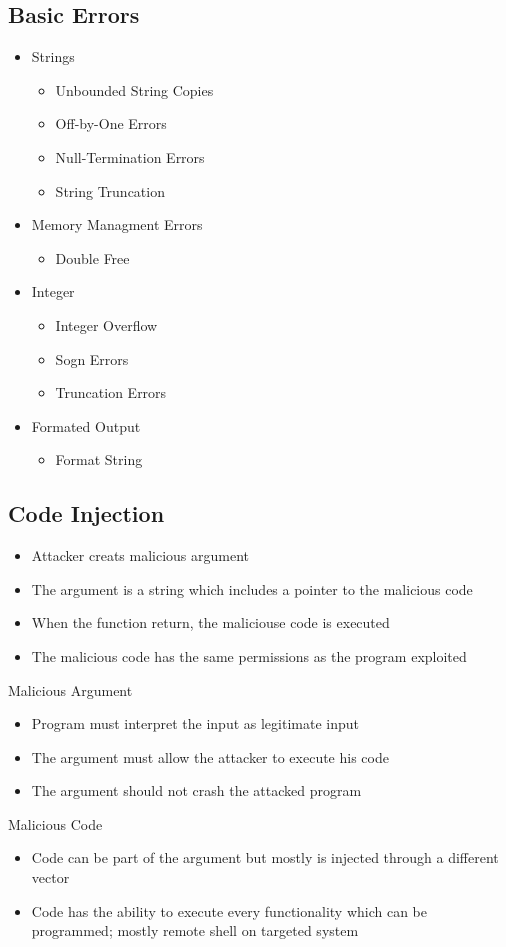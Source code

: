\documentclass[a4paper, 12pt]{article}
\begin{document}
\subsection{Basic Errors}
\begin{itemize}
\item Strings
\begin{itemize}
\item Unbounded String Copies
\item Off-by-One Errors
\item Null-Termination Errors
\item String Truncation
\end{itemize}
\item Memory Managment Errors
\begin{itemize}
\item Double Free
\end{itemize}
\item Integer
\begin{itemize}
\item Integer Overflow
\item Sogn Errors
\item Truncation Errors
\end{itemize}
\item Formated Output
\begin{itemize}
\item Format String
\end{itemize}
\end{itemize} 

\subsection{Code Injection}
\begin{itemize}
\item Attacker creats malicious argument
\item The argument is a string which includes a pointer to the malicious code
\item When the function return, the maliciouse code is executed
\item The malicious code has the same permissions as the program exploited
\end{itemize}
\large Malicious Argument
\begin{itemize}
\item Program must interpret the input as legitimate input
\item The argument must allow the attacker to execute his code
\item The argument should not crash the attacked program
\end{itemize}
\large Malicious Code
\begin{itemize}
\item Code can be part of the argument but mostly is injected through a different vector
\item Code has the ability to execute every functionality which can be programmed; mostly remote shell on targeted system
\end{itemize}
\end{document}
